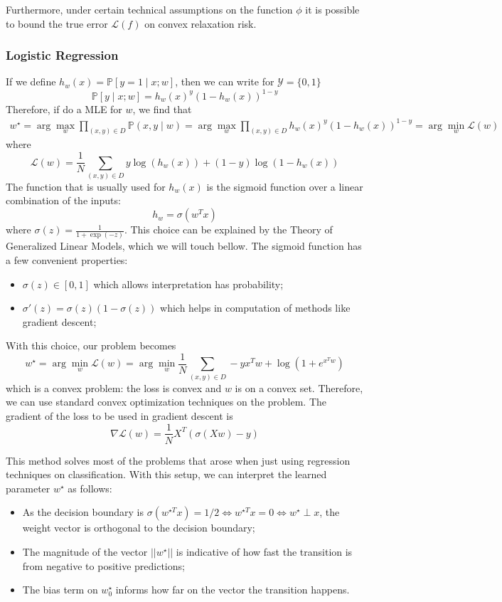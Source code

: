 \documentclass{article}
\newcommand{\prob}{\mathbb{P}}
\newcommand{\loss}{\mathcal{L}}
\begin{document}
Furthermore, under certain technical assumptions on the function $\phi$ it is possible to bound the true error $\loss(f)$ on convex relaxation risk.

\subsubsection{Logistic Regression}

If we define $h_w(x) = \prob[y = 1 \mid x ; w]$, then we can write for $\mathcal{Y} = \{0,1\}$
$$
\prob[ y \mid x ; w ] = h_w(x)^y (1 - h_w(x))^{1 - y}
$$
Therefore, if do a MLE for $w$, we find that 
\begin{gather*}
w^\star =
\arg \max_w \prod_{(x,y) \in D} \prob(x, y \mid w) =
\arg \max_w \prod_{(x,y) \in D} h_w(x)^y (1 - h_w(x))^{1 - y} =
\arg \min_w \loss(w)
\end{gather*}
where 
$$
\loss(w) = \frac{1}{N} \sum_{(x,y) \in D} y \log(h_w(x)) + (1-y) \log(1-h_w(x))
$$
The function that is usually used for $h_w(x)$ is the sigmoid function over a linear combination of the inputs:
$$
h_w = \sigma(w^T x)
$$
where $\sigma(z) = \frac{1}{1 + \exp(-z)}$.
This choice can be explained by the Theory of Generalized Linear Models, which we will touch bellow.
The sigmoid function has a few convenient properties:
\begin{itemize}
    \item $\sigma(z) \in [0,1]$ which allows interpretation has probability;
    \item $\sigma'(z) = \sigma(z)(1-\sigma(z))$ which helps in computation of methods like gradient descent;
\end{itemize}

With this choice, our problem becomes
$$
w^\star = 
\arg \min_w \loss(w) =
\arg \min_w \frac{1}{N} \sum_{(x,y) \in D} -y x^T w + \log(1 + e^{x^T w})
$$
which is a convex problem: the loss is convex and $w$ is on a convex set.
Therefore, we can use standard convex optimization techniques on the problem.
The gradient of the loss to be used in gradient descent is 
$$
\nabla \loss(w) = \frac{1}{N} X^T (\sigma(Xw) - y)
$$

This method solves most of the problems that arose when just using regression techniques on classification.
With this setup, we can interpret the learned parameter $w^\star$ as follows:
\begin{itemize}
    \item As the decision boundary is $\sigma(w^{\star T} x) = 1/2 \Leftrightarrow w^{\star T} x = 0 \Leftrightarrow w^\star \perp x$, the weight vector is orthogonal to the decision boundary;
    \item The magnitude of the vector $||w^\star||$ is indicative of how fast the transition is from negative to positive predictions;
    \item The bias term on $w^\star_0$ informs how far on the vector the transition happens.
\end{itemize}
\end{document}
